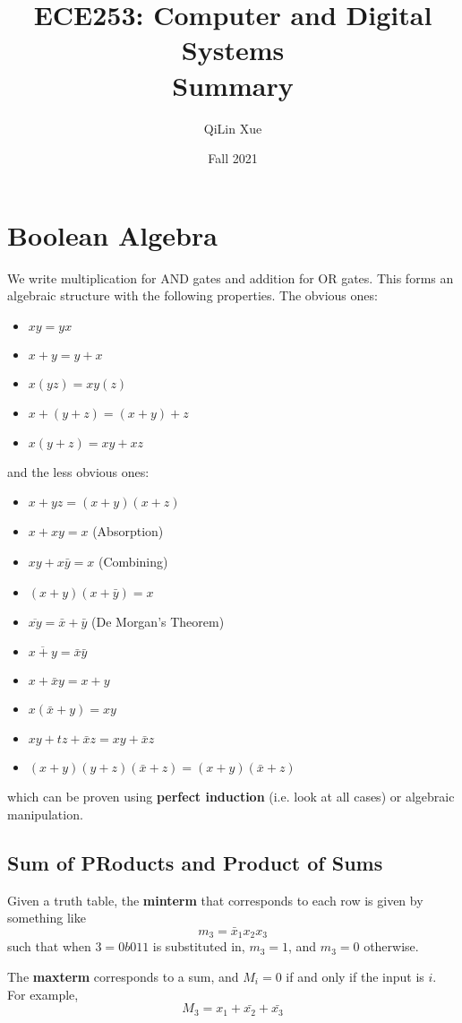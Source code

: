 \documentclass{article}
\title{ECE253: Computer and Digital Systems \\ \textbf{Summary}}
\author{QiLin Xue}
\date{Fall 2021}
\begin{document}
\maketitle
\tableofcontents
\newpage
\section{Boolean Algebra}
We write multiplication for AND gates and addition for OR gates. This forms an algebraic structure with the following properties. The obvious ones:
\begin{itemize}
    \item $xy=yx$
    \item $x+y=y+x$
    \item $x(yz)=xy(z)$
    \item $x+(y+z)=(x+y)+z$
    \item $x(y+z)=xy+xz$
\end{itemize}
and the less obvious ones: 
\begin{itemize}
    \item $x + yz = (x+y)(x+z)$
    \item $x+xy = x$ (Absorption)
    \item $xy+x\bar{y}=x$ (Combining)
    \item $(x+y)(x+\bar{y})=x$
    \item $\overline{xy}=\bar{x}+\bar{y}$ (De Morgan's Theorem)
    \item $\overline{x+y}=\bar{x}\bar{y}$ 
    \item $x+\bar{x}y=x+y$
    \item $x(\bar{x}+y)=xy$
    \item $xy+tz+\bar{x}z=xy+\bar{x}z$
    \item $(x+y)(y+z)(\bar{x}+z)=(x+y)(\bar{x}+z)$
\end{itemize}
which can be proven using \textbf{perfect induction} (i.e. look at all cases) or algebraic manipulation.
\subsection{Sum of PRoducts and Product of Sums}
Given a truth table, the \textbf{minterm} that corresponds to each row is given by something like 
\begin{equation}
    m_3 = \bar{x}_1x_2x_3
\end{equation}
such that when $3=0b011$ is substituted in, $m_3=1$, and $m_3=0$ otherwise.

The \textbf{maxterm} corresponds to a sum, and $M_i=0$ if and only if the input is $i$. For example, 
\begin{equation}
    M_3 = x_1 + \bar{x_2} + \bar{x_3}
\end{equation}
\end{document}

